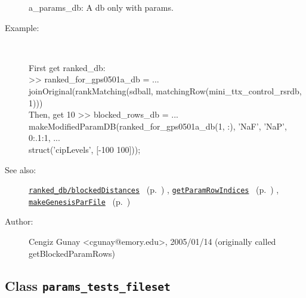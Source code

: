 \begin{description}
	a\_params\_db: A db only with params.
%
\item[Example:]~
\begin{lyxcode} First get ranked\_db:\\%
 >> ranked\_for\_gps0501a\_db = ...\\%
      joinOriginal(rankMatching(sdball, matchingRow(mini\_ttx\_control\_rsrdb, 1)))\\%
 Then, get 10%
 >> blocked\_rows\_db = ...\\%
      makeModifiedParamDB(ranked\_for\_gps0501a\_db(1, :), {'NaF', 'NaP'}, 0:.1:1, ...\\%
                           struct('cipLevels', [-100 100]));\\%
\end{lyxcode}
%
\item[See also:]%
\hyperlink{ref_ranked_db__blockedDistances}{\texttt{ranked\_db/blockedDistances}}%
\ (p.~\pageref{ref_ranked_db__blockedDistances})%
%
, \hyperlink{ref_getParamRowIndices}{\texttt{getParamRowIndices}}%
\ (p.~\pageref{ref_getParamRowIndices})%
%
, \hyperlink{ref_makeGenesisParFile}{\texttt{makeGenesisParFile}}%
\ (p.~\pageref{ref_makeGenesisParFile})%
%
%
\item[Author:]%
Cengiz Gunay <cgunay@emory.edu>, 2005/01/14 (originally called getBlockedParamRows)%
\end{description}
\methodline%
\subsection{Class \texttt{params\_tests\_fileset}}%
%
\label{ref_params_tests_fileset}%
\hypertarget{ref_params_tests_fileset}{}%
